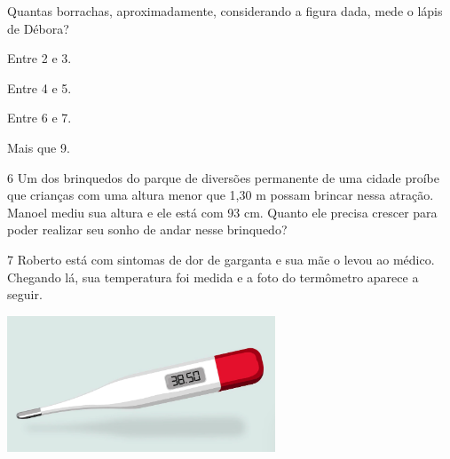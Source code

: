 \begin{multicols}{2}
Quantas borrachas, aproximadamente, considerando a figura dada, mede o lápis de Débora?

\begin{minipage}{.5\textwidth}
\begin{escolha}
\item
  Entre 2 e 3.
\item
  Entre 4 e 5.
\item
  Entre 6 e 7.
\item
  Mais que 9.
\end{escolha}
\end{minipage}

\num{6} Um dos brinquedos do parque de diversões permanente de uma cidade proíbe
que crianças com uma altura menor que 1,30 m possam brincar nessa
atração. Manoel mediu sua altura e ele está com 93 cm. Quanto ele
precisa crescer para poder realizar seu sonho de andar nesse brinquedo?





\num{7} Roberto está com sintomas de dor de garganta e sua mãe o levou ao
médico. Chegando lá, sua temperatura foi medida e a foto do termômetro
aparece a seguir.

\includegraphics[width=3.15000in,height=1.59426in]{media/image47.png}




\end{multicols}
